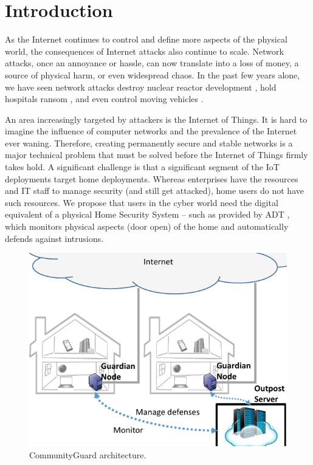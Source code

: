 \section{Introduction}
\label{sec:intro}

As the Internet continues to control and define more aspects of the physical world, the consequences of Internet attacks also continue to scale. Network attacks, once an annoyance or hassle, can now translate into a loss of money, a source of physical harm, or even widespread chaos. In the past few years alone, we have seen network attacks destroy nuclear reactor development \cite{stux}, hold hospitals ransom \cite{ransom}, and even control moving vehicles \cite{carhack}. 

An area increasingly targeted by attackers is the Internet of Things. It is hard to imagine the influence of computer networks and the prevalence of the Internet ever waning. Therefore, creating permanently secure and stable networks is a major technical problem that must be solved before the Internet of Things firmly takes hold. A significant challenge is that a significant segment of the IoT deployments target home deployments.  Whereas enterprises have the resources and IT staff to manage security (and still get attacked), home users do not have such resources.  We propose that users in the cyber world need the digital equivalent of a physical Home Security System -- such as provided by ADT \cite{adt}, which monitors physical aspects (\eg door open) of the home and automatically defends against intrusions. 



\begin{figure}
    \centering
    \includegraphics[width=0.87\columnwidth]{figs/highlevel.pdf}
    \caption{CommunityGuard architecture.}
    \label{fig:arch}
\end{figure}



